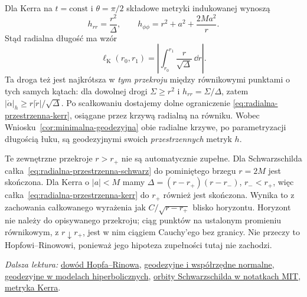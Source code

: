 Dla Kerra na $t=\mathrm{const}$ i $\theta=\pi/2$
składowe metryki indukowanej wynoszą
\[
 h_{rr}=\frac{r^2}{\Delta},\qquad
 h_{\phi\phi}=r^2+a^2+\frac{2Ma^2}{r}.
\]
Stąd radialna długość ma wzór
\begin{equation}\label{eq:radialna-przestrzenna-kerr}
 \ell_{\mathrm K}(r_0,r_1)
   =\left|\int_{r_0}^{r_1}
                   \frac r{\sqrt\Delta}\,\dd r\right|.
\end{equation}
Ta droga też jest najkrótsza w \emph{tym przekroju}
między równikowymi punktami o tych samych
kątach: dla dowolnej drogi $\Sigma\geq r^2$
i $h_{rr}=\Sigma/\Delta$, zatem
$|\dot\alpha|_h\geq r|\dot r|/\sqrt\Delta$.
Po scałkowaniu dostajemy dolne ograniczenie
\eqref{eq:radialna-przestrzenna-kerr}, osiągane
przez krzywą radialną na równiku. Wobec
Wniosku~\ref{cor:minimalna-geodezyjna}
obie radialne krzywe, po parametryzacji
długością łuku, są geodezyjnymi swoich
\emph{przestrzennych} metryk $h$.

Te zewnętrzne przekroje $r>r_+$ nie są
automatycznie zupełne. Dla Schwarzschilda
całka~\eqref{eq:radialna-przestrzenna-schwarz}
do pominiętego brzegu $r=2M$ jest skończona.
Dla Kerra o $|a|<M$ mamy
$\Delta=(r-r_+)(r-r_-)$, $r_-<r_+$,
więc całka~\eqref{eq:radialna-przestrzenna-kerr}
do $r_+$ również jest skończona.
Wynika to z zachowania całkowanego wyrażenia
jak $C/\sqrt{r-r_+}$ blisko horyzontu.
Horyzont nie należy do opisywanego przekroju;
ciąg punktów na ustalonym promieniu równikowym,
z $r\downarrow r_+$, jest w nim ciągiem Cauchy'ego bez granicy. Nie przeczy
to Hopfowi--Rinowowi, ponieważ jego hipoteza
zupełności tutaj nie zachodzi.

\par\smallskip
{\footnotesize\noindent\emph{Dalsza lektura:}
\href{https://math.uchicago.edu/~may/REU2016/REUPapers/Spiegel.pdf}
{dowód Hopfa--Rinowa},
\href{https://www.math.toronto.edu/mein/teaching/LectureNotes/rieall.pdf}
{geodezyjne i współrzędne normalne},
\href{https://math.uchicago.edu/~dannyc/courses/kleinian_groups_2015/kleinian_groups.pdf}
{geodezyjne w modelach hiperbolicznych},
\href{https://ocw.mit.edu/courses/8-033-relativity-fall-2006/bc94629f28eae7b92641aecbc4bf8502_lecture21_bh1.pdf}
{orbity Schwarzschilda w notatkach MIT},
\href{https://sites.science.oregonstate.edu/coursewikis/GGR/book/content/kerr}
{metryka Kerra}.\par}
